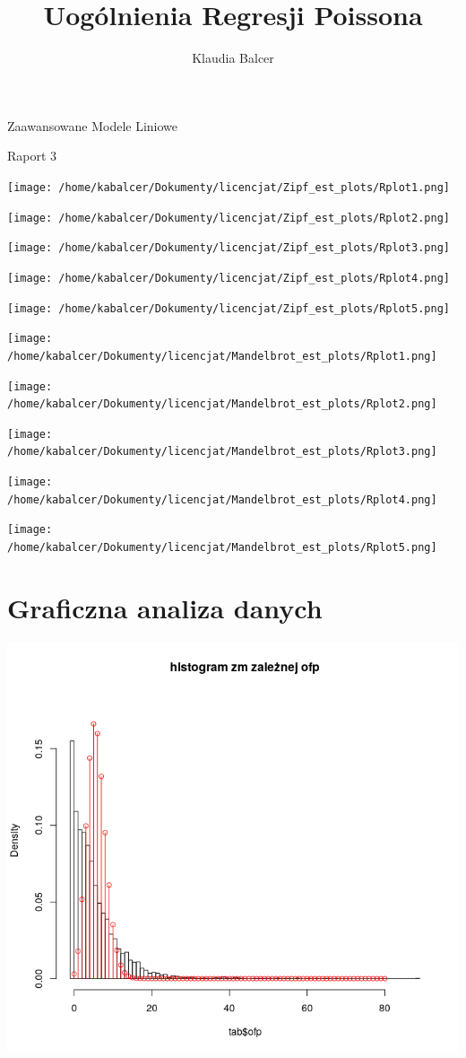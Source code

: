 \documentclass[a4paper,11pt]{article}
\author{Klaudia Balcer}
\title{Uogólnienia Regresji Poissona}
\begin{document}
\maketitle
\begin{center}
Zaawansowane Modele Liniowe

Raport 3 
\end{center}
\tableofcontents


\texttt{[image: /home/kabalcer/Dokumenty/licencjat/Zipf\_est\_plots/Rplot1.png]} 

\texttt{[image: /home/kabalcer/Dokumenty/licencjat/Zipf\_est\_plots/Rplot2.png]} 

\texttt{[image: /home/kabalcer/Dokumenty/licencjat/Zipf\_est\_plots/Rplot3.png]} 

\texttt{[image: /home/kabalcer/Dokumenty/licencjat/Zipf\_est\_plots/Rplot4.png]} 

\texttt{[image: /home/kabalcer/Dokumenty/licencjat/Zipf\_est\_plots/Rplot5.png]} 

\texttt{[image: /home/kabalcer/Dokumenty/licencjat/Mandelbrot\_est\_plots/Rplot1.png]} 

\texttt{[image: /home/kabalcer/Dokumenty/licencjat/Mandelbrot\_est\_plots/Rplot2.png]} 

\texttt{[image: /home/kabalcer/Dokumenty/licencjat/Mandelbrot\_est\_plots/Rplot3.png]} 

\texttt{[image: /home/kabalcer/Dokumenty/licencjat/Mandelbrot\_est\_plots/Rplot4.png]} 

\texttt{[image: /home/kabalcer/Dokumenty/licencjat/Mandelbrot\_est\_plots/Rplot5.png]} 

\section{Graficzna analiza danych}

\includegraphics[scale=1]{Rplot0.png} 
\end{document}
